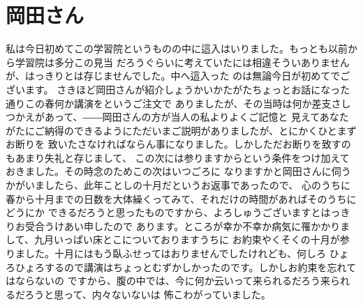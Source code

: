 \section{岡田さん}
私は今日初めてこの学習院というものの中に這入はいりました。もっとも以前から学習院は多分この見当
だろうぐらいに考えていたには相違そういありませんが、はっきりとは存じませんでした。中へ這入った
のは無論今日が初めてでございます。
さきほど岡田さんが紹介しょうかいかたがたちょっとお話になった通りこの春何か講演をというご注文で
ありましたが、その当時は何か差支さしつかえがあって、――岡田さんの方が当人の私よりよくご記憶と
見えてあなたがたにご納得のできるようにただいまご説明がありましたが、とにかくひとまずお断りを
致いたさなければならん事になりました。しかしただお断りを致すのもあまり失礼と存じまして、
この次には参りますからという条件をつけ加えておきました。その時念のためこの次はいつごろに
なりますかと岡田さんに伺うかがいましたら、此年ことしの十月だというお返事であったので、
心のうちに春から十月までの日数を大体繰くってみて、それだけの時間があればそのうちにどうにか
できるだろうと思ったものですから、よろしゅうございますとはっきりお受合うけあい申したので
あります。ところが幸か不幸か病気に罹かかりまして、九月いっぱい床とこについておりますうちに
お約束やくそくの十月が参りました。十月にはもう臥ふせってはおりませんでしたけれども、何しろ
ひょろひょろするので講演はちょっとむずかしかったのです。しかしお約束を忘れてはならないの
ですから、腹の中では、今に何か云いって来られるだろう来られるだろうと思って、内々ないないは
怖こわがっていました。
